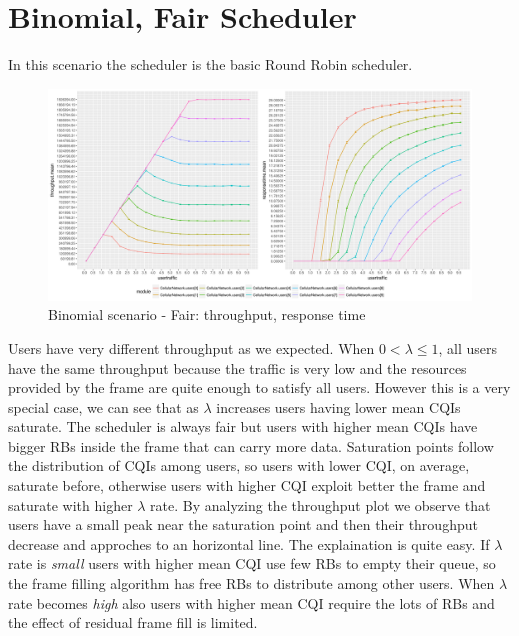 \section{Binomial, Fair Scheduler}
In this scenario the scheduler is the basic Round Robin scheduler.

\begin{figure}[H]
  \includegraphics[width=1\textwidth]{images/binom}
  \caption{Binomial scenario - Fair: throughput, response time}
  \label{fig:Binomial scenario - Fair: throughput, response time}
\end{figure}
Users have very different throughput as we expected. When \( 0 < \lambda \leq 1\), all users have the same throughput because the traffic is very low and the resources provided by the frame are quite enough to satisfy all users. However this is a very special case, we can see that as \(\lambda\) increases users having lower mean CQIs saturate. The scheduler is always fair but users with higher mean CQIs have bigger RBs inside the frame that can carry more data. Saturation points follow the distribution of CQIs among users, so users with lower CQI, on average, saturate before, otherwise users with higher CQI exploit better the frame and saturate with higher \(\lambda\) rate. 
By analyzing the throughput plot we observe that users have a small peak near the saturation point and then their throughput decrease and approches to an horizontal line. The explaination is quite easy. If \(\lambda\) rate is \textit{small} users with higher mean CQI use few RBs to empty their queue, so the frame filling algorithm has free RBs to distribute among other users. When \(\lambda\) rate becomes \textit{high} also users with higher mean CQI require the lots of RBs and the effect of residual frame fill is limited. 

